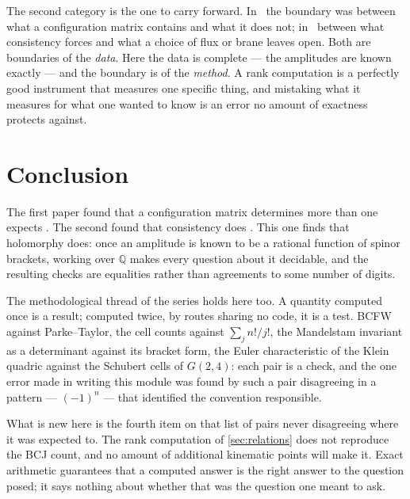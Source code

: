 \documentclass[11pt,a4paper]{article}
\newcommand{\QQ}{\mathbb{Q}}
\theoremstyle{definition}
\begin{document}
\noindent
The second category is the one to carry forward. In~\cite{SuppMath} the
boundary was between what a configuration matrix contains and what it does
not; in~\cite{SuppStrings} between what consistency forces and what a choice
of flux or brane leaves open. Both are boundaries of the \emph{data}. Here the
data is complete --- the amplitudes are known exactly --- and the boundary is
of the \emph{method}. A rank computation is a perfectly good instrument that
measures one specific thing, and mistaking what it measures for what one
wanted to know is an error no amount of exactness protects against.


\section{Conclusion}
\label{sec:conclusion}

The first paper found that a configuration matrix determines more than one
expects \cite{SuppMath}. The second found that consistency does \cite{SuppStrings}. 
This one finds that holomorphy does: once an amplitude is known to be a rational function of
spinor brackets, working over $\QQ$ makes every question about it decidable,
and the resulting checks are equalities rather than agreements to some number of digits.

The methodological thread of the series holds here too. A quantity computed
once is a result; computed twice, by routes sharing no code, it is a test.
BCFW against Parke--Taylor, the cell counts against $\sum_j n!/j!$, the
Mandelstam invariant as a determinant against its bracket form, the Euler
characteristic of the Klein quadric against the Schubert cells of $G(2,4)$:
each pair is a check, and the one error made in writing this module was found
by such a pair disagreeing in a pattern --- $(-1)^n$ --- that identified the
convention responsible.

What is new here is the fourth item on that list of pairs never disagreeing
where it was expected to. The rank computation of \cref{sec:relations} does
not reproduce the BCJ count, and no amount of additional kinematic points will
make it. Exact arithmetic guarantees that a computed answer is the right
answer to the question posed; it says nothing about whether that was the
question one meant to ask.

\end{document}
